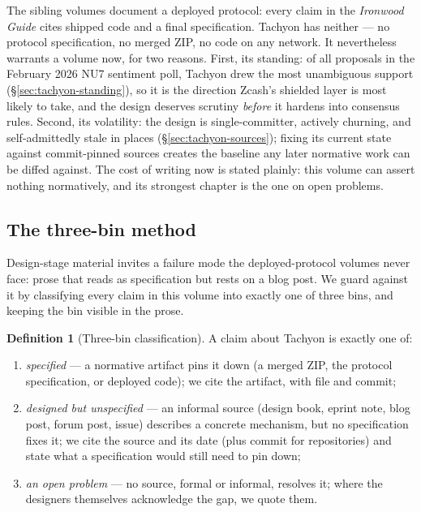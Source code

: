 \documentclass[11pt,a4paper]{article}
\theoremstyle{definition}
\newtheorem{definition}[theorem]{Definition}
\begin{document}
The sibling volumes document a deployed protocol: every claim in the
\emph{Ironwood Guide} cites shipped code and a final specification. Tachyon has
neither --- no protocol specification, no merged ZIP, no code on any network.
It nevertheless warrants a volume now, for two reasons. First, its standing:
of all proposals in the February 2026 NU7 sentiment poll, Tachyon drew the
most unambiguous support (\S\ref{sec:tachyon-standing}), so it is the
direction Zcash's shielded layer is most likely to take, and the design
deserves scrutiny \emph{before} it hardens into consensus rules. Second, its
volatility: the design is single-committer, actively churning, and
self-admittedly stale in places
(\S\ref{sec:tachyon-sources}); fixing its current state against commit-pinned
sources creates the baseline any later normative work can be diffed against.
The cost of writing now is stated plainly: this volume can assert nothing
normatively, and its strongest chapter is the one on open problems.

\subsection{The three-bin method}\label{sec:tachyon-bins}

Design-stage material invites a failure mode the deployed-protocol volumes
never face: prose that reads as specification but rests on a blog post. We
guard against it by classifying every claim in this volume into exactly one of
three bins, and keeping the bin visible in the prose.

\begin{definition}[Three-bin classification]\label{def:three-bins}
A claim about Tachyon is exactly one of:
\begin{enumerate}[label=(\roman*)]
\item \emph{specified} --- a normative artifact pins it down (a merged ZIP, the
  protocol specification, or deployed code); we cite the artifact, with file
  and commit;
\item \emph{designed but unspecified} --- an informal source (design book,
  eprint note, blog post, forum post, issue) describes a concrete mechanism,
  but no specification fixes it; we cite the source and its date (plus commit
  for repositories) and state what a specification would still need to pin
  down;
\item \emph{an open problem} --- no source, formal or informal, resolves it;
  where the designers themselves acknowledge the gap, we quote them.
\end{enumerate}
\end{definition}
\end{document}

